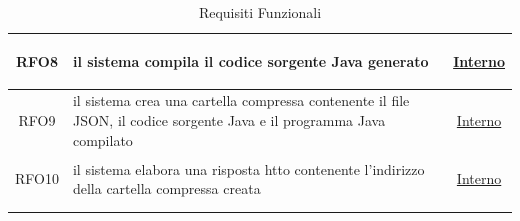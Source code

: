 \begin{longtable}{|c|>{\centering}m{7cm}|c|}
\hypertarget{RFO8}{RFO8} & il sistema compila il codice sorgente Java generato& \hyperlink{Interno}{Interno}\\ \hline
	
\hypertarget{RFO9}{RFO9} & il sistema crea una cartella compressa contenente il file JSON, il codice sorgente Java e il programma Java compilato & \hyperlink{Interno}{Interno}\\ \hline

\hypertarget{RFO10}{RFO10} & il sistema elabora una risposta htto contenente l'indirizzo della cartella compressa creata & \hyperlink{Interno}{Interno}\\ \hline

\caption[Requisiti Funzionali]{Requisiti Funzionali}
\label{tabella:req0}
\end{longtable}
\clearpage


